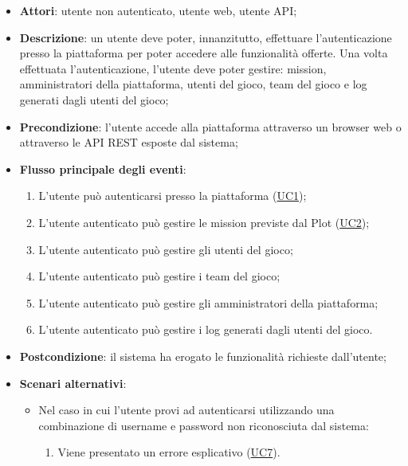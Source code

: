 \begin{itemize}
\item \textbf{Attori}: utente non autenticato, utente web, utente API;
\item \textbf{Descrizione}: un utente deve poter, innanzitutto, effettuare l'autenticazione presso la piattaforma per poter accedere alle funzionalità offerte.
Una volta effettuata l'autenticazione, l'utente deve poter gestire: mission, amministratori della piattaforma, utenti del gioco, team del gioco e log generati dagli utenti del gioco; 
      \item \textbf{Precondizione}: l'utente accede alla piattaforma attraverso un browser web o attraverso le API REST esposte dal sistema;

        \item \textbf{Flusso principale degli eventi}:
          \begin{enumerate}
          \item L'utente può autenticarsi presso la piattaforma (\hyperlink{UC1}{UC1});
          \item L'utente autenticato può gestire le mission previste dal Plot (\hyperlink{UC2}{UC2});
          \item L'utente autenticato può gestire gli utenti del gioco;
          \item L'utente autenticato può gestire i team del gioco;
          \item L'utente autenticato può gestire gli amministratori della piattaforma;
          \item L'utente autenticato può gestire i log generati dagli utenti del gioco.

      \end{enumerate}
    \item \textbf{Postcondizione}: il sistema ha erogato le funzionalità richieste dall'utente;
     \item \textbf{Scenari alternativi}: 
      \begin{itemize}
       \item Nel caso in cui l'utente provi ad autenticarsi utilizzando una combinazione di username e password non riconosciuta dal sistema: 
       \begin{enumerate}
          \item Viene presentato un errore esplicativo (\hyperlink{UC7}{UC7}).
       \end{enumerate}
      \end{itemize}
  \end{itemize}
\hypertarget{UC1}{}

